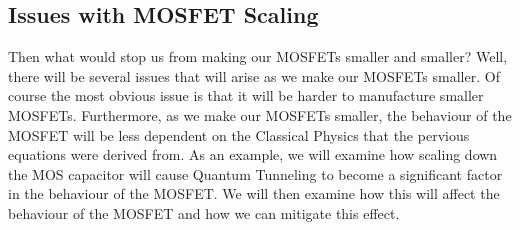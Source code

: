 \documentclass[
  reprint,
  amsmath,amssymb,
  aps
]{revtex4-1}
\begin{document}
\subsection{\label{sec:level2}Issues with MOSFET Scaling}
Then what would stop us from making our MOSFETs smaller and smaller? Well, there will be several issues that will 
arise as we make our MOSFETs smaller. Of course the most obvious issue is that it will be harder to manufacture smaller MOSFETs. Furthermore, 
as we make our MOSFETs smaller, the behaviour of the MOSFET will be less dependent on the Classical Physics that the pervious 
equations were derived from. As an example, we will examine how scaling down the 
MOS capacitor will cause Quantum Tunneling to become a significant factor in the behaviour of the MOSFET. We will 
then examine how this will affect the behaviour of the MOSFET and how we can mitigate this effect.\\\\
\end{document}
